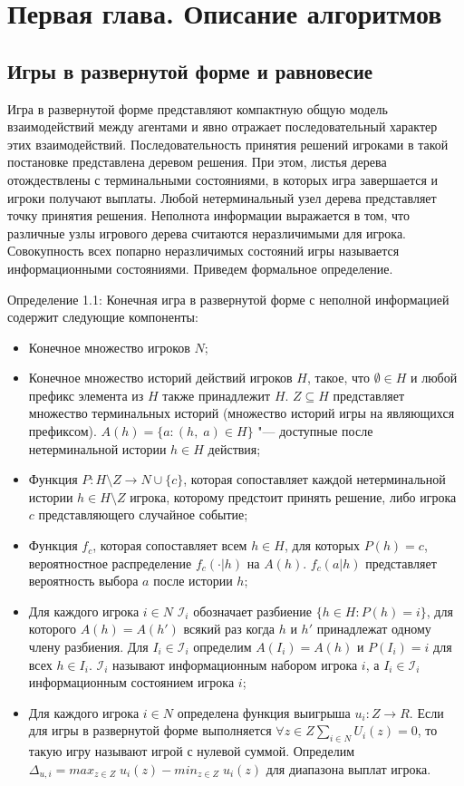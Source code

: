 \chapter{Первая глава. Описание алгоритмов}
\label{cha:ch_1}
\section{Игры в развернутой форме и равновесие}
\par
Игра в развернутой форме представляют компактную общую модель взаимодействий между агентами и явно отражает последовательный характер этих взаимодействий. Последовательность принятия решений игроками в такой постановке представлена деревом решения. При этом, листья дерева отождествлены с терминальными состояниями, в которых игра завершается и игроки получают выплаты. Любой нетерминальный узел дерева представляет точку принятия решения. Неполнота информации выражается в том, что различные узлы игрового дерева считаются неразличимыми для игрока. Совокупность всех попарно неразличимых состояний игры называется информационными состояниями. Приведем формальное определение.
\par
Определение 1.1: Конечная игра в развернутой форме с неполной информацией содержит следующие компоненты:
\begin{itemize}
	\item Конечное множество игроков $N$;
	\item Конечное множество историй действий игроков $H$, такое, что $\emptyset \in H$ и любой префикс элемента из $H$ также принадлежит $H$. $Z \subseteq H$ представляет множество терминальных историй (множество историй игры на являющихся префиксом). $A(h)=\{a \colon (h,\;a)\in H \}$ "--- доступные после нетерминальной истории $h\in H$ действия;
	\item Функция $P\colon H\setminus Z \to N \cup \{c\}$, которая сопоставляет каждой нетерминальной истории $h\in H\setminus Z$ игрока, которому предстоит принять решение, либо игрока $c$ представляющего случайное событие;
	\item Функция $f_c$, которая сопоставляет всем $h \in H$, для которых $P(h)=c$, вероятностное распределение $f_c(\cdot |h)$ на $A(h)$. $f_c(a|h)$ представляет вероятность выбора $a$ после истории $h$;
	\item Для каждого игрока $i \in N$ $\mathcal{I}_i $ обозначает разбиение $ \{h \in H \colon P(h) = i\}$, для которого $A(h)=A(h')$ всякий раз когда $h$ и $h'$ принадлежат одному члену разбиения. Для $I_i \in \mathcal{I}_i$ определим $A(I_i)=A(h)$ и $P(I_i)=i$ для всех $h \in I_i$. $\mathcal{I}_i$ называют информационным набором игрока $i$, а $I_i \in \mathcal{I}_i$ информационным состоянием игрока $i$;
	\item Для каждого игрока $i \in N$ определена функция выигрыша $u_i \colon Z \to R$. Если для игры в развернутой форме выполняется $\forall z \in Z \sum_{i \in N}U_i(z) = 0 $, то такую игру называют игрой с нулевой суммой. Определим $\Delta_{u,i} = max_{z\in Z}\;u_i(z) - min_{z\in Z}\;u_i(z)$ для диапазона выплат игрока. 
\end{itemize}
